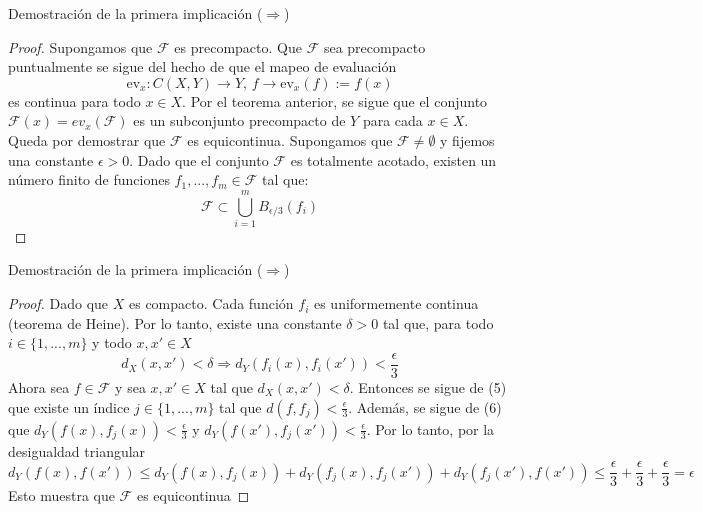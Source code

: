 \begin{frame}{Demostración de la primera implicación ($\Rightarrow$)}
    \begin{proof}
     Supongamos que $\mathcal{F}$ es precompacto. Que $\mathcal{F}$ sea precompacto puntualmente se sigue del hecho de que el mapeo de evaluación
        \[
            \text{ev}_x : C(X, Y) \to Y,\, 
            f\to \text{ev}_x(f) := f(x)
        \]
     es continua para todo $x\in X$. Por el teorema anterior, se sigue que el conjunto $\mathcal F(x) = ev_{x}(\mathcal{F})$ es un subconjunto precompacto de $Y$
     para cada $x\in X$.\\
     \medskip
     Queda por demostrar que $\mathcal{F}$ es equicontinua. Supongamos que $\mathcal{F}\neq \emptyset$ y fijemos una constante $\epsilon>0$. Dado que el conjunto $\mathcal{F}$ es totalmente
     acotado, existen un número finito de funciones $f_1,...,f_m\in \mathcal{F}$ tal que:
        \begin{equation}
        \mathcal{F}\subset \bigcup_{i=1}^{m} B_{\epsilon/3}(f_i)
        \end{equation}
    \end{proof}
\end{frame}

\begin{frame}{Demostración de la primera implicación ($\Rightarrow$)}
    \begin{proof}
     Dado que $X$ es compacto. Cada función $f_i$ es uniformemente continua (teorema de Heine). Por lo tanto, existe una constante $\delta>0$ tal que, para todo $i\in \{1,...,m\}$ y todo $x,x'\in X$
        \begin{equation}
         d_{X}(x,x')<\delta \Rightarrow d_{Y}(f_{i}(x),f_{i}(x'))<\frac{\epsilon}{3}
        \end{equation}
    Ahora sea $f\in \mathcal{F}$ y sea $x,x'\in X$ tal que $d_{X}(x,x')<\delta$. Entonces se sigue de (5) que existe un índice $j\in \{1,...,m\}$ tal que $d(f,f_{j})<\frac{\epsilon}{3}$. Además, se sigue de (6)
    que $d_{Y}(f(x),f_{j}(x))<\frac{\epsilon}{3}$ y $d_{Y}(f(x'),f_{j}(x'))<\frac{\epsilon}{3}$. Por lo tanto, por la desigualdad triangular
        \[
         d_{Y}(f(x),f(x'))\leq d_{Y}(f(x),f_{j}(x))+d_{Y}(f_{j}(x),f_{j}(x'))+d_{Y}(f_{j}(x'),f(x')) \leq \frac{\epsilon}{3}+\frac{\epsilon}{3}+\frac{\epsilon}{3}=\epsilon
        \]
    Esto muestra que $\mathcal{F}$ es equicontinua
    \end{proof}
\end{frame}

